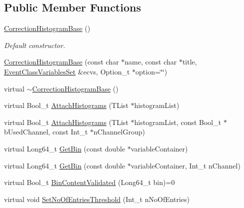 \subsection*{Public Member Functions}
\begin{DoxyCompactItemize}
\item 
\mbox{\label{classQn_1_1CorrectionHistogramBase_a55ffedbb27258f2bf1e662f828f9501c}} 
\mbox{\hyperlink{classQn_1_1CorrectionHistogramBase_a55ffedbb27258f2bf1e662f828f9501c}{Correction\+Histogram\+Base}} ()
\begin{DoxyCompactList}\small\item\em Default constructor. \end{DoxyCompactList}\item 
\mbox{\hyperlink{classQn_1_1CorrectionHistogramBase_ae60d38510dda50104d646b2c28da24f8}{Correction\+Histogram\+Base}} (const char $\ast$name, const char $\ast$title, \mbox{\hyperlink{classQn_1_1EventClassVariablesSet}{Event\+Class\+Variables\+Set}} \&ecvs, Option\+\_\+t $\ast$option=\char`\"{}\char`\"{})
\item 
virtual \mbox{\hyperlink{classQn_1_1CorrectionHistogramBase_ad938c894b552cda9e368c756b9462f70}{$\sim$\+Correction\+Histogram\+Base}} ()
\item 
virtual Bool\+\_\+t \mbox{\hyperlink{classQn_1_1CorrectionHistogramBase_ad8bcd0079fe5db561780a522e46b7b16}{Attach\+Histograms}} (T\+List $\ast$histogram\+List)
\item 
virtual Bool\+\_\+t \mbox{\hyperlink{classQn_1_1CorrectionHistogramBase_afa979697b43e2ebd0580a3359b2aca63}{Attach\+Histograms}} (T\+List $\ast$histogram\+List, const Bool\+\_\+t $\ast$b\+Used\+Channel, const Int\+\_\+t $\ast$n\+Channel\+Group)
\item 
virtual Long64\+\_\+t \mbox{\hyperlink{classQn_1_1CorrectionHistogramBase_ab1f64550f4e1812864da6f9f6ea565e6}{Get\+Bin}} (const double $\ast$variable\+Container)
\item 
virtual Long64\+\_\+t \mbox{\hyperlink{classQn_1_1CorrectionHistogramBase_acfde166908e4da950470841f21f87fb9}{Get\+Bin}} (const double $\ast$variable\+Container, Int\+\_\+t n\+Channel)
\item 
virtual Bool\+\_\+t \mbox{\hyperlink{classQn_1_1CorrectionHistogramBase_a4db2c92ceaffefaa91475a721612d80d}{Bin\+Content\+Validated}} (Long64\+\_\+t bin)=0
\item 
virtual void \mbox{\hyperlink{classQn_1_1CorrectionHistogramBase_ab398bab718b21e952de6dd84fbaef683}{Set\+No\+Of\+Entries\+Threshold}} (Int\+\_\+t n\+No\+Of\+Entries)

\end{DoxyCompactItemize}
